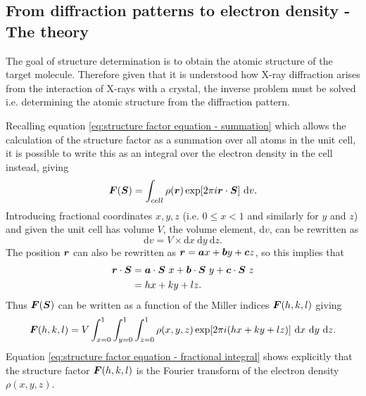     \subsection{From diffraction patterns to electron density - The theory}
    \label{sub:From diffraction patterns to electron density - The theory}
        The goal of structure determination is to obtain the atomic structure of the target molecule.
        Therefore given that it is understood how X-ray diffraction arises from the interaction of X-rays with a crystal, the inverse problem must be solved i.e. determining the atomic structure from the diffraction pattern.

        Recalling equation \ref{eq:structure factor equation - summation} which allows the calculation of the structure factor as a summation over all atoms in the unit cell, it is possible to write this as an integral over the electron density in the cell instead, giving
        \begin{equation}
            \boldsymbol{F}(\boldsymbol{S}) = \int_{cell} \rho(\boldsymbol{r})\exp[2 \pi i \boldsymbol{r} \cdot \boldsymbol{S}]\ \mathrm{d}v.
            \label{eq:structure factor equation - integral}
        \end{equation}
        Introducing fractional coordinates $x, y, z$ (i.e. $0 \leq x < 1$ and similarly for $y$ and $z$) and given the unit cell has volume $V$, the volume element, $\mathrm{d}v$, can be rewritten as
        \begin{equation}
            \mathrm{d}v = V \times \mathrm{d}x\ \mathrm{d}y\ \mathrm{d}z.
        \end{equation}
        The position $\boldsymbol{r}$ can also be rewritten as $\boldsymbol{r} = \boldsymbol{a}x + \boldsymbol{b}y + \boldsymbol{c}z$, so this implies that
        \begin{align}
            \boldsymbol{r} \cdot \boldsymbol{S} &= \boldsymbol{a}\cdot\boldsymbol{S}\ x + \boldsymbol{b}\cdot\boldsymbol{S}\ y + \boldsymbol{c}\cdot\boldsymbol{S}\ z \\
            &= hx + ky + lz.
        \end{align}
        Thus $\boldsymbol{F}(\boldsymbol{S})$ can be written as a function of the Miller indices $\boldsymbol{F}(h,k,l)$ giving
        \begin{equation}
            \bs{F}(h,k,l) = V \int_{x=0}^1 \int_{y=0}^1 \int_{z=0}^1 \rho(x,y,z) \exp[2\pi i (hx + ky + lz)]\ \mathrm{d}x\ \mathrm{d}y\ \mathrm{d}z.
            \label{eq:structure factor equation - fractional integral}
        \end{equation}
        Equation \ref{eq:structure factor equation - fractional integral} shows explicitly that the structure factor $\boldsymbol{F}(h,k,l)$ is the Fourier transform of the electron density $\rho(x,y,z)$.
